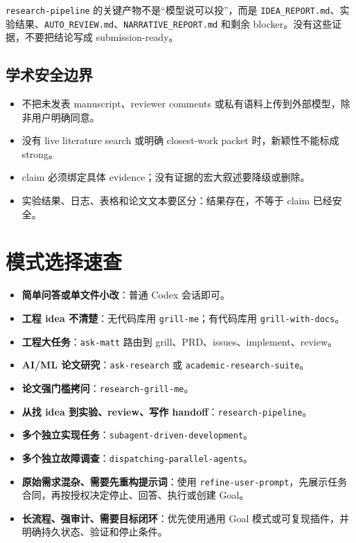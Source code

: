 \documentclass[UTF8,a4paper,11pt,fontset=none]{ctexart}
\newcommand{\skill}[1]{\texttt{#1}}
\newcommand{\file}[1]{\texttt{#1}}
\newcommand{\keypoint}[1]{\textbf{#1}}
\begin{document}
\skill{research-pipeline} 的关键产物不是“模型说可以投”，而是 \file{IDEA\_REPORT.md}、实验结果、\file{AUTO\_REVIEW.md}、\file{NARRATIVE\_REPORT.md} 和剩余 blocker。没有这些证据，不要把结论写成 submission-ready。

\subsection{学术安全边界}

\begin{itemize}
  \item 不把未发表 manuscript、reviewer comments 或私有语料上传到外部模型，除非用户明确同意。
  \item 没有 live literature search 或明确 closest-work packet 时，新颖性不能标成 strong。
  \item claim 必须绑定具体 evidence；没有证据的宏大叙述要降级或删除。
  \item 实验结果、日志、表格和论文文本要区分：结果存在，不等于 claim 已经安全。
\end{itemize}

\section{模式选择速查}

\begin{itemize}
  \item \keypoint{简单问答或单文件小改}：普通 Codex 会话即可。
  \item \keypoint{工程 idea 不清楚}：无代码库用 \skill{grill-me}；有代码库用 \skill{grill-with-docs}。
  \item \keypoint{工程大任务}：\skill{ask-matt} 路由到 grill、PRD、issues、implement、review。
  \item \keypoint{AI/ML 论文研究}：\skill{ask-research} 或 \skill{academic-research-suite}。
  \item \keypoint{论文强门槛拷问}：\skill{research-grill-me}。
  \item \keypoint{从找 idea 到实验、review、写作 handoff}：\skill{research-pipeline}。
  \item \keypoint{多个独立实现任务}：\skill{subagent-driven-development}。
  \item \keypoint{多个独立故障调查}：\skill{dispatching-parallel-agents}。
  \item \keypoint{原始需求混杂、需要先重构提示词}：使用 \skill{refine-user-prompt}，先展示任务合同，再按授权决定停止、回答、执行或创建 Goal。
  \item \keypoint{长流程、强审计、需要目标闭环}：优先使用通用 Goal 模式或可复现插件，并明确持久状态、验证和停止条件。
\end{itemize}
\end{document}
